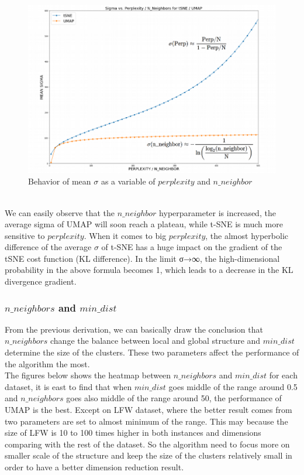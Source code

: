 \begin{enumerate}[1)]
\begin{figure}[ht]

\centering
\includegraphics[width=12cm,height=7cm\textwidth]{images/image_sigmma.png}
\caption{Behavior of mean $\sigma$ as a variable of $perplexity$ and $n\_neighbor$}
\label{fig:label}
\end{figure}\\

We can easily observe that the $n\_neighbor$ hyperparameter is increased, the average sigma of UMAP will soon reach a plateau, while t-SNE is much more sensitive to $perplexity$. When it comes to big $perplexity$, the almost hyperbolic difference of the average $\sigma$ of t-SNE has a huge impact on the gradient of the tSNE cost function (KL difference). In the limit σ→∞, the high-dimensional probability in the above formula becomes 1, which leads to a decrease in the KL divergence gradient.

\subsubsection{$n\_neighbors$ and $min\_dist$}

From the previous derivation, we can basically draw the conclusion that $n\_neighbors$ change the balance between local and global structure and $min\_dist$ determine the size of the clusters. These two parameters affect the performance of the algorithm the most.\\

The figures below shows the heatmap between $n\_neighbors$ and $min\_dist$ for each dataset, it is east to find that when $min\_dist$ goes middle of the range around 0.5 and $n\_neighbors$ goes also middle of the range around 50, the performance of UMAP is the best. Except on LFW dataset, where the better result comes from two parameters are set to almost minimum of the range. This may because the size of LFW is 10 to 100 times higher in both instances and dimensions comparing with the rest of the dataset. So the algorithm need to focus more on smaller scale of the structure and keep the size of the clusters relatively small in order to have a better dimension reduction result.  


\end{enumerate}
